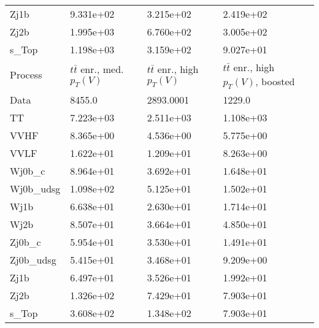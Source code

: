 \begin{table}
{\begin{tabularx}{0.8\textwidth}{|X|X|X|X|}
Zj1b & 9.331e+02 & 3.215e+02 & 2.419e+02 \\
Zj2b & 1.995e+03 & 6.760e+02 & 3.005e+02 \\
s\_Top & 1.198e+03 & 3.159e+02 & 9.027e+01 \\
\hline
\hline
Process & $t\bar{t}$ enr., med. $p_{T}(V)$ & $t\bar{t}$ enr., high $p_{T}(V)$ & $t\bar{t}$ enr., high $p_{T}(V)$, boosted \\
\hline
Data & 8455.0 & 2893.0001 & 1229.0 \\
\hline
TT & 7.223e+03 & 2.511e+03 & 1.108e+03 \\
VVHF & 8.365e+00 & 4.536e+00 & 5.775e+00 \\
VVLF & 1.622e+01 & 1.209e+01 & 8.263e+00 \\
Wj0b\_c & 8.964e+01 & 3.692e+01 & 1.648e+01 \\
Wj0b\_udsg & 1.098e+02 & 5.125e+01 & 1.502e+01 \\
Wj1b & 6.638e+01 & 2.630e+01 & 1.714e+01 \\
Wj2b & 8.507e+01 & 3.664e+01 & 4.850e+01 \\
Zj0b\_c & 5.954e+01 & 3.530e+01 & 1.491e+01 \\
Zj0b\_udsg & 5.415e+01 & 3.468e+01 & 9.209e+00 \\
Zj1b & 6.497e+01 & 3.526e+01 & 1.992e+01 \\
Zj2b & 1.326e+02 & 7.429e+01 & 7.903e+01 \\
s\_Top & 3.608e+02 & 1.348e+02 & 7.903e+01 \\
\hline
\end{tabularx}
}
\label{tab:cr-Znn-2016}
\end{table}

